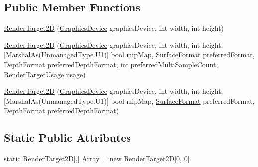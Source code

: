 \subsection*{Public Member Functions}
\begin{DoxyCompactItemize}
\item 
\hyperlink{class_microsoft_1_1_xna_1_1_framework_1_1_graphics_1_1_render_target2_d_a717e114b8d5bf4990d95ffc4248f16dc}{Render\+Target2\+D} (\hyperlink{class_microsoft_1_1_xna_1_1_framework_1_1_graphics_1_1_graphics_device}{Graphics\+Device} graphics\+Device, int width, int height)
\item 
\hyperlink{class_microsoft_1_1_xna_1_1_framework_1_1_graphics_1_1_render_target2_d_a2a7e4f72a03166f23cb83706e8319ff3}{Render\+Target2\+D} (\hyperlink{class_microsoft_1_1_xna_1_1_framework_1_1_graphics_1_1_graphics_device}{Graphics\+Device} graphics\+Device, int width, int height, \mbox{[}Marshal\+As(Unmanaged\+Type.\+U1)\mbox{]} bool mip\+Map, \hyperlink{namespace_microsoft_1_1_xna_1_1_framework_1_1_graphics_abb47f8b6c5b33dc8516f74c0e80dbfba}{Surface\+Format} preferred\+Format, \hyperlink{namespace_microsoft_1_1_xna_1_1_framework_1_1_graphics_a33e4c82174cc14ee1a0271584be306f5}{Depth\+Format} preferred\+Depth\+Format, int preferred\+Multi\+Sample\+Count, \hyperlink{namespace_microsoft_1_1_xna_1_1_framework_1_1_graphics_aa1482d7ae24968832f0ca9ed3d38ea27}{Render\+Target\+Usage} usage)
\item 
\hyperlink{class_microsoft_1_1_xna_1_1_framework_1_1_graphics_1_1_render_target2_d_ad0342e33c642da4666927dd3cb83a6b9}{Render\+Target2\+D} (\hyperlink{class_microsoft_1_1_xna_1_1_framework_1_1_graphics_1_1_graphics_device}{Graphics\+Device} graphics\+Device, int width, int height, \mbox{[}Marshal\+As(Unmanaged\+Type.\+U1)\mbox{]} bool mip\+Map, \hyperlink{namespace_microsoft_1_1_xna_1_1_framework_1_1_graphics_abb47f8b6c5b33dc8516f74c0e80dbfba}{Surface\+Format} preferred\+Format, \hyperlink{namespace_microsoft_1_1_xna_1_1_framework_1_1_graphics_a33e4c82174cc14ee1a0271584be306f5}{Depth\+Format} preferred\+Depth\+Format)
\end{DoxyCompactItemize}
\subsection*{Static Public Attributes}
\begin{DoxyCompactItemize}
\item 
static \hyperlink{class_microsoft_1_1_xna_1_1_framework_1_1_graphics_1_1_render_target2_d}{Render\+Target2\+D}\mbox{[},\mbox{]} \hyperlink{class_microsoft_1_1_xna_1_1_framework_1_1_graphics_1_1_render_target2_d_a6779dd0823b468678b857afa840f7efc}{Array} = new \hyperlink{class_microsoft_1_1_xna_1_1_framework_1_1_graphics_1_1_render_target2_d}{Render\+Target2\+D}\mbox{[}0, 0\mbox{]}
\end{DoxyCompactItemize}
